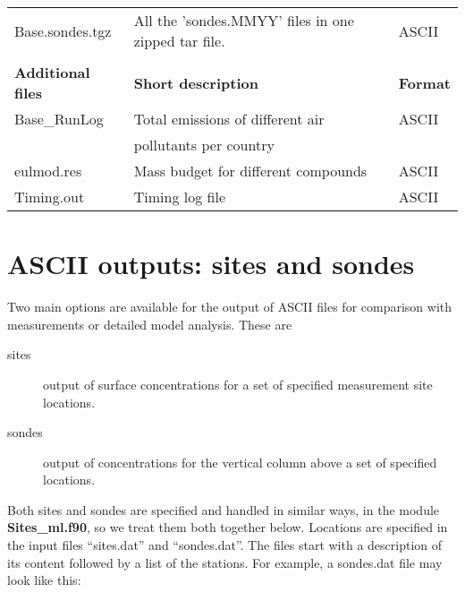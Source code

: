 \begin{table}[h!]
\begin{center}
\begin{tabular}{lll}
    Base.sondes.tgz& All the 'sondes.MMYY' files in one zipped tar file.& ASCII\\ 
& &\\ \hline
{\bf Additional files} &  {\bf Short description} & {\bf Format}\\
    Base\_RunLog & Total emissions of different air   & ASCII\\
 & pollutants per country& \\
eulmod.res & Mass budget for different compounds & ASCII\\
Timing.out & Timing log file& ASCII \\
 
\hline
\end{tabular}
\end{center}

\label{Tab:outputs}
\end{table}


\newpage
\section{ASCII outputs: sites and sondes}\label{sec:sitesonde}


Two main options are available for the output of ASCII files for comparison
with measurements or detailed model analysis. These are

\begin{description}
\item[sites]  

      output of surface concentrations for a set of specified
      measurement site locations.
\item[sondes] 

      output of concentrations for the vertical column above
     a set of specified locations.
\end{description}

Both sites and sondes are specified and handled in similar ways, in
the module {\bf Sites\_ml.f90}, so we treat them both together below.
Locations are specified in the input files ``sites.dat'' and ``sondes.dat''. 
The files start with a description of its content
followed by a list of the stations. For example, a sondes.dat file
may look like this:

